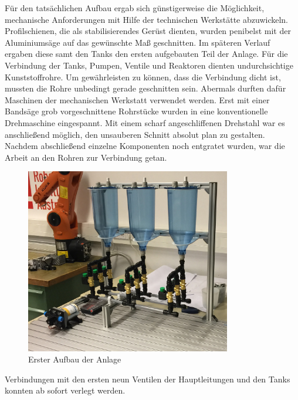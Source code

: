 	Für den tatsächlichen Aufbau ergab sich günstigerweise die Möglichkeit, mechanische Anforderungen mit Hilfe der technischen Werkstätte abzuwickeln. Profilschienen, die als stabilisierendes Gerüst dienten, wurden penibelst mit der Aluminiumsäge auf das gewünschte Maß geschnitten. Im späteren Verlauf ergaben diese samt den Tanks den ersten aufgebauten Teil der Anlage. Für die Verbindung der Tanks, Pumpen, Ventile und Reaktoren dienten undurchsichtige Kunststoffrohre. Um gewährleisten zu können, dass die Verbindung dicht ist, mussten die Rohre unbedingt gerade geschnitten sein. Abermals durften dafür Maschinen der mechanischen Werkstatt verwendet werden. Erst mit einer Bandsäge grob vorgeschnittene Rohrstücke wurden in eine konventionelle Drehmaschine eingespannt. Mit einem scharf angeschliffenen Drehstahl war es anschließend möglich, den unsauberen Schnitt absolut plan zu gestalten. Nachdem abschließend einzelne Komponenten noch entgratet wurden, war die Arbeit an den Rohren zur Verbindung getan.\\
	
	\begin{figure}[h!]
	  \centering
	  \includegraphics[width=0.8\textwidth]{graphics/implementation/ErsterAufbau.jpg}
	  \caption{Erster Aufbau der Anlage}
	  \label{fig:erster_aufbau}
	\end{figure}	
	
	Verbindungen mit den ersten neun Ventilen der Hauptleitungen und den Tanks konnten ab sofort verlegt werden.\\
		
